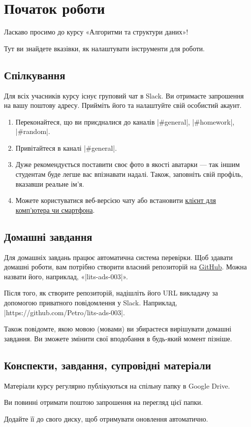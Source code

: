 \documentclass[12pt,a4paper]{article}
\begin{document}
\section*{Початок роботи}

Ласкаво просимо до курсу «Алгоритми та структури даних»!

Тут ви знайдете вказівки, як налаштувати інструменти для роботи.


\subsection*{Спілкування}

Для всіх учасників курсу існує груповий чат в Slack.
Ви отримаєте запрошення на вашу поштову адресу.
Прийміть його та налаштуйте свій особистий акаунт.

\begin{enumerate}
    \item Переконайтеся, що ви приєдналися до каналів |#general|, |#homework|, |#random|.
    \item Привітайтеся в каналі |#general|.
    \item Дуже рекомендується поставити своє фото в якості аватарки --- так іншим студентам буде легше вас впізнавати надалі. Також, заповніть свій профіль, вказавши реальне ім’я.
    \item Можете користуватися веб-версією чату або встановити \href{https://slack.com/downloads}{клієнт для комп’ютера чи смартфона}.
\end{enumerate}


\subsection*{Домашні завдання}

Для домашніх завдань працює автоматична система перевірки.
Щоб здавати домашні роботи, вам потрібно створити власний репозиторій на \href{https://github.com}{\color{blue}GitHub}.
Можна назвати його, наприклад, «|lits-ads-003|».

Після того, як створите репозиторій, надішліть його URL викладачу за допомогою приватного повідомлення у Slack.
Наприклад, |https://github.com/Petro/lits-ads-003|.

Також повідомте, якою мовою (мовами) ви збираєтеся вирішувати домашні завдання.
Ви зможете змінити свої вподобання в будь-який момент пізніше.


\subsection*{Конспекти, завдання, супровідні матеріали}

Матеріали курсу регулярно публікуються на спільну папку в Google Drive.

Ви повинні отримати поштою запрошення на перегляд цієї папки.

Додайте її до свого диску, щоб отримувати оновлення автоматично.
\end{document}
